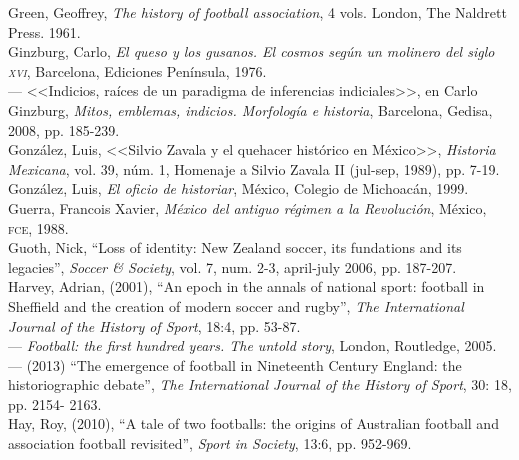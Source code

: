 \documentclass[11pt,a5paper,twoside]{book} %
\begin{document}
\begin{hangparas}{1cm}{1}
\noindent Green, Geoffrey, \emph{The history of football association}, 4 vols. London, The Naldrett Press. 1961. \\

\noindent Ginzburg, Carlo, \emph{El queso y los gusanos. El cosmos según un molinero del siglo \textsc{xvi}}, Barcelona, Ediciones Península, 1976. \\

\noindent --- <<Indicios, raíces de un paradigma de inferencias indiciales>>, en Carlo Ginzburg, \emph{Mitos, emblemas, indicios. Morfología e historia}, Barcelona, Gedisa, 2008, pp. 185-239. \\

\noindent González, Luis, <<Silvio Zavala y el quehacer histórico en México>>, \emph{Historia Mexicana}, vol. 39, núm. 1, Homenaje a Silvio Zavala II (jul-sep, 1989), pp. 7-19. \\

\noindent González, Luis, \emph{El oficio de historiar}, México, Colegio de Michoacán, 1999. \\

\noindent Guerra, Francois Xavier, \emph{México del antiguo régimen a la Revolución}, México, \textsc{fce}, 1988. \\

\noindent Guoth, Nick, “Loss of identity: New Zealand soccer, its fundations and its legacies”, \emph{Soccer \& Society}, vol. 7, num. 2-3, april-july 2006, pp. 187-207. \\

\noindent Harvey, Adrian, (2001), “An epoch in the annals of national sport: football in Sheffield and the creation of modern soccer and rugby”, \emph{The International Journal of the History of Sport}, 18:4, pp. 53-87. \\

\noindent --- \emph{Football: the first hundred years. The untold story}, London, Routledge, 2005. \\

\noindent --- (2013) “The emergence of football in Nineteenth Century England: the historiographic debate”, \emph{The International Journal of the History of Sport}, 30: 18, pp. 2154- 2163. \\

\noindent Hay, Roy, (2010), “A tale of two footballs: the origins of Australian football and association football revisited”, \emph{Sport in Society}, 13:6, pp. 952-969. \\


\end{hangparas}
\end{document}
